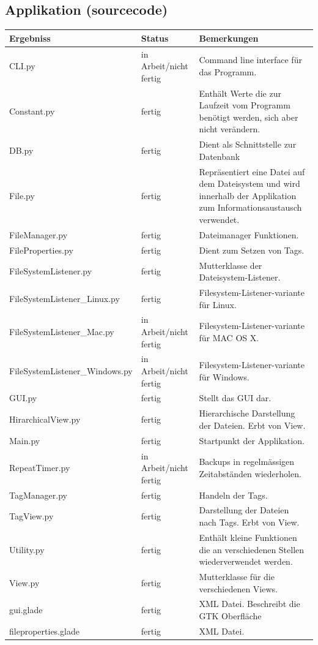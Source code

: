 \documentclass[10pt,paper=a4,final]{scrartcl}
\begin{document}
\subsection{Applikation (sourcecode)}
\begin{tabularx}{\textwidth}{|l|l|X|}
\hline
 \bf Ergebniss \cellcolor{blue!20!}& \bf Status \cellcolor{blue!20!}& \bf Bemerkungen \cellcolor{blue!20!} \\ \hline
CLI.py & in Arbeit/nicht fertig \cellcolor{red}& Command line interface f\"ur das Programm.\\ \hline
Constant.py & fertig \cellcolor{green}& Enth\"alt Werte die zur Laufzeit vom Programm ben\"otigt werden, sich aber nicht ver\"andern. \\ \hline
DB.py & fertig \cellcolor{green}& Dient als Schnittstelle zur Datenbank \\ \hline
File.py & fertig \cellcolor{green}& Repr\"asentiert eine Datei auf dem Dateisystem und wird innerhalb der Applikation zum Informationsaustausch verwendet. \\ \hline
FileManager.py & fertig \cellcolor{green}& Dateimanager Funktionen. \\ \hline
FileProperties.py & fertig \cellcolor{green}& Dient zum Setzen von Tags. \\ \hline
FileSystemListener.py & fertig \cellcolor{green}& Mutterklasse der Dateisystem-Listener. \\ \hline
FileSystemListener\_Linux.py & fertig \cellcolor{green}& Filesystem-Listener-variante f\"ur Linux. \\ \hline
FileSystemListener\_Mac.py & in Arbeit/nicht fertig \cellcolor{red}& Filesystem-Listener-variante f\"ur MAC OS X. \\ \hline
FileSystemListener\_Windows.py & in Arbeit/nicht fertig \cellcolor{red}& Filesystem-Listener-variante f\"ur Windows. \\ \hline
GUI.py & fertig \cellcolor{green}& Stellt das GUI dar. \\ \hline
HirarchicalView.py &  fertig \cellcolor{green}& Hierarchische Darstellung der Dateien. Erbt von View.\\ \hline
Main.py & fertig \cellcolor{green}& Startpunkt der Applikation. \\ \hline
RepeatTimer.py & in Arbeit/nicht fertig \cellcolor{red}& Backups in regelm\"assigen Zeitabst\"anden wiederholen. \\ \hline
TagManager.py & fertig \cellcolor{green}& Handeln der Tags. \\ \hline
TagView.py & fertig \cellcolor{green}& Darstellung der Dateien nach Tags. Erbt von View. \\ \hline
Utility.py & fertig \cellcolor{green}& Enth\"alt kleine Funktionen die an verschiedenen Stellen wiederverwendet werden. \\ \hline
View.py & fertig \cellcolor{green}& Mutterklasse f\"ur die verschiedenen Views. \\ \hline
gui.glade & fertig \cellcolor{green}& XML Datei. Beschreibt die GTK Oberfl\"ache \\ \hline
fileproperties.glade & fertig \cellcolor{green}& XML Datei. \\ \hline
\end{tabularx}
\end{document}
